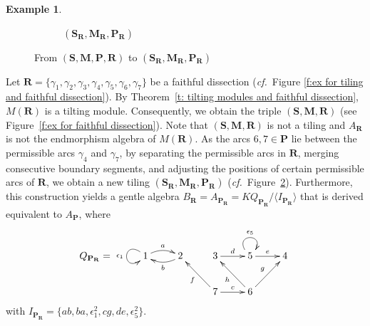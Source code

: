 \documentclass[a4paper,10pt]{amsart}
\theoremstyle{plain}          %
\theoremstyle{definition}
\newtheorem{ex}[theorem]{Example}
\def\SS{\mathbf{S}}
\def\RR{\mathbf{R}}
\def\MM{\mathbf{M}}
\def\PP{\mathbf{P}}
\def\MM{\mathbf{M}}
\newcommand{\confer}{{\em cf.}\ }
\begin{document}
\begin{ex}
\begin{figure}[htpb]
\begin{subfigure}[b]{0.48\textwidth}
\begin{tikzpicture}[scale=0.8]
      \end{tikzpicture}
		\caption{$(\SS_\RR,\MM_\RR,\PP_\RR)$}\label{f:ex}
	\end{subfigure}
	
	\caption{ From $(\SS,\MM,\PP,\RR)$ to $(\SS_\RR,\MM_\RR,\PP_\RR)$}
\end{figure}
 Let $\mathbf{R}=\{\gamma_1,\gamma_2,\gamma_3,\gamma_4,\gamma_5,\gamma_6,\gamma_7\}$ be a faithful dissection (\confer Figure \ref{f:ex for tiling and faithful dissection}).
By Theorem~\ref{t: tilting modules and faithful dissection},  $M(\RR)$ is a tilting module. Consequently, we obtain the triple $(\SS,\MM,\RR)$ (see Figure~\ref{f:ex for faithful dissection}). Note that $(\SS,\MM,\RR)$ is not a tiling and $A_{\RR}$ is not the endmorphism algebra of $M(\RR)$. As the arcs $6,7 \in \PP$ lie between the permissible arcs $\gamma_4$ and $\gamma_7$, by separating the permissible arcs in $\RR$, merging consecutive boundary segments, and adjusting the positions of certain permissible arcs of $\RR$, we obtain a new tiling $(\SS_\RR,\MM_\RR,\PP_\RR)$ (\confer Figure~\ref{f:ex}). Furthermore, this construction yields a gentle algebra $B_{\RR}=A_{\PP_{\RR}} = KQ_{\PP_{\RR}}/\langle I_{\PP_{\RR}}\rangle$ that is derived equivalent to $A_\PP$, where \[Q_{\PP_{\RR}}=\xymatrix{\ar@(lu,ld)[]_{\epsilon_1}1\ar@/^.5pc/[r]^{a}&2\ar@/^.5pc/[l]^{b}&3\ar[r]^d&5\ar@(ul,ur)[]^{\epsilon_5}\ar[r]^e&4\\ 
				&&7\ar[lu]^{f}\ar[r]^{c}&6\ar[lu]^{h}\ar[ru]^g}\]
            with $I_{\PP_{\RR}}=\{ab,ba,\epsilon_1^2,cg,de,\epsilon_5^2\}.$


\end{ex}
\end{document}
